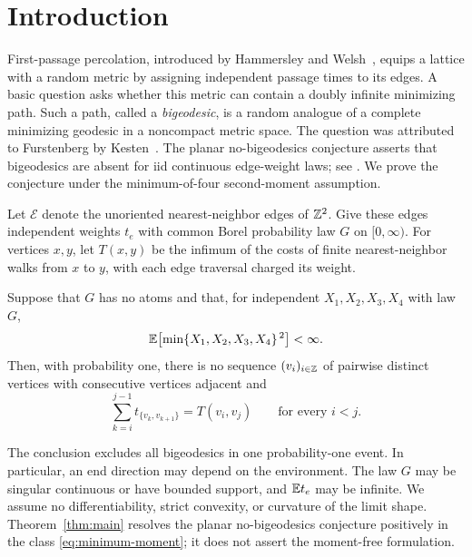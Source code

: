 \section{Introduction}
\label{sec:introduction}

First-passage percolation, introduced by Hammersley and
Welsh~\cite{HammersleyWelsh1965}, equips a lattice with a random metric
by assigning independent passage times to its edges. A basic question asks
whether this metric can contain a doubly infinite minimizing path.
Such a path, called a \emph{bigeodesic}, is a random analogue of a
complete minimizing geodesic in a noncompact metric space.
The question was attributed to Furstenberg by
Kesten~\cite[Remark 9.22]{Kesten}.
The planar no-bigeodesics conjecture asserts that bigeodesics are absent
for iid continuous edge-weight laws; see
\cite[Conjecture 1 and the discussion preceding it]{DamronHanson}.
We prove the conjecture under the minimum-of-four second-moment
assumption.

Let \(\mathcal E\) denote the unoriented nearest-neighbor edges of
\(\mathbb Z^2\). Give these edges independent weights \(t_e\) with common
Borel probability law \(G\) on \([0,\infty)\). For vertices \(x,y\),
let \(T(x,y)\) be the infimum of the costs of finite nearest-neighbor
walks from \(x\) to \(y\), with each edge traversal charged its weight.

\begin{theorem}\label{thm:main}
Suppose that \(G\) has no atoms and that, for independent
\(X_1,X_2,X_3,X_4\) with law \(G\),
\begin{equation}\label{eq:minimum-moment}
 \mathbb E\!\left[\min\{X_1,X_2,X_3,X_4\}^{\,2}\right]<\infty.
\end{equation}
Then, with probability one, there is no sequence
\((v_i)_{i\in\mathbb Z}\) of pairwise distinct vertices with consecutive
vertices adjacent and
\[
 \sum_{k=i}^{j-1}t_{\{v_k,v_{k+1}\}}=T(v_i,v_j)
 \qquad\text{for every }i<j.
\]
\end{theorem}

The conclusion excludes all bigeodesics in one probability-one event.
In particular, an end direction may depend on the environment.
The law \(G\) may be singular continuous or have bounded support,
and \(\mathbb E t_e\) may be infinite. We assume no differentiability,
strict convexity, or curvature of the limit shape.
Theorem~\ref{thm:main} resolves the planar no-bigeodesics conjecture
positively in the class \eqref{eq:minimum-moment}; it does not
assert the moment-free formulation.

